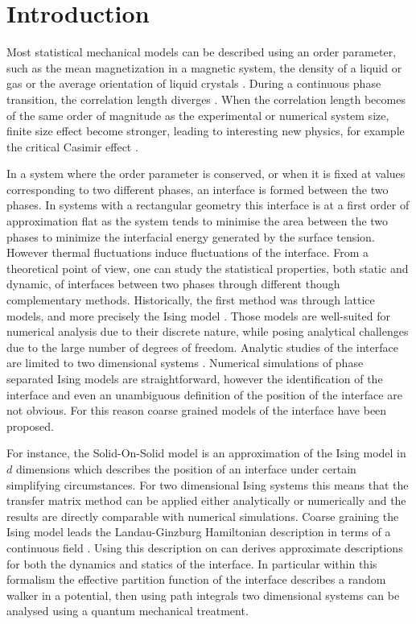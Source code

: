 \chapter*{Introduction}

Most statistical mechanical  models can be  described using an order parameter, such as the mean magnetization in a magnetic system, the density of a liquid or gas or the average orientation of liquid crystals \cite{l_landau_physique_1990}. During a continuous phase transition, the correlation length diverges \cite{goldenfeld_lectures_2018}. When the correlation length becomes of the same order of magnitude as the experimental or numerical system size, finite size effect  become stronger, leading to interesting new physics, for example the  critical Casimir effect \cite{gambassi_casimir_2009}.

In a system where the order parameter is conserved, or when it is fixed at values corresponding to two different phases, an interface is formed between the two phases.
In systems with a rectangular geometry this interface is at a first order of approximation flat as the system tends to minimise the area between the two phases to minimize the interfacial energy generated by the surface tension. However thermal fluctuations induce fluctuations of the interface. From a theoretical point of view, one can study the statistical properties, both static and dynamic, of interfaces between two phases through different though complementary methods. Historically, the first method was through lattice models, and more precisely the Ising model \cite{niss_history_2005}. Those models are well-suited for numerical analysis due to their discrete nature, while posing analytical challenges due to the large number of degrees of freedom. Analytic studies of the interface are limited to two dimensional systems \cite{abraham_transfer_1973}. Numerical simulations of phase separated Ising models are straightforward, however the identification of the interface and even an unambiguous definition of the position of the interface are not obvious. For this reason coarse grained models of the interface have been proposed.

For instance, the Solid-On-Solid model \cite{gilmer_simulation_1972} is an approximation of the Ising model in $d$ dimensions which describes the position of an interface under certain simplifying circumstances. For two dimensional Ising systems this means that the transfer matrix method can be applied either analytically or numerically and the results are directly comparable with numerical simulations.
Coarse graining the Ising model leads the Landau-Ginzburg Hamiltonian description in terms of a continuous field \cite{amit_field_2005}. Using this description on can derives approximate descriptions for both the dynamics and statics of the interface. In particular within this formalism the effective partition function of the interface describes a random walker in a potential, then using path integrals \cite{matsubara_new_1955} two dimensional systems can be analysed using a quantum mechanical treatment.

